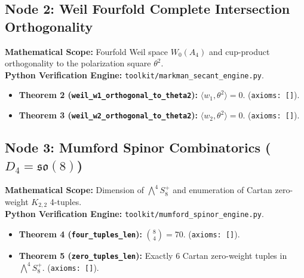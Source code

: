\documentclass[11pt,a4paper]{article}
\begin{document}
\subsection{Node 2: Weil Fourfold Complete Intersection Orthogonality}
\textbf{Mathematical Scope:} Fourfold Weil space $W_0(A_4)$ and cup-product orthogonality to the polarization square $\theta^2$.\\
\textbf{Python Verification Engine:} \texttt{toolkit/markman\_secant\_engine.py}.
\begin{itemize}[leftmargin=1.5em]
\item \textbf{Theorem 2 (\texttt{weil\_w1\_orthogonal\_to\_theta2}):} $\langle w_1, \theta^2 \rangle = 0$. (\texttt{axioms: []}).
\item \textbf{Theorem 3 (\texttt{weil\_w2\_orthogonal\_to\_theta2}):} $\langle w_2, \theta^2 \rangle = 0$. (\texttt{axioms: []}).
\end{itemize}

\subsection{Node 3: Mumford Spinor Combinatorics ($D_4 = \mathfrak{so}(8)$)}
\textbf{Mathematical Scope:} Dimension of $\bigwedge^4 S^+_8$ and enumeration of Cartan zero-weight $K_{2,2}$ 4-tuples.\\
\textbf{Python Verification Engine:} \texttt{toolkit/mumford\_spinor\_engine.py}.
\begin{itemize}[leftmargin=1.5em]
\item \textbf{Theorem 4 (\texttt{four\_tuples\_len}):} $\binom{8}{4} = 70$. (\texttt{axioms: []}).
\item \textbf{Theorem 5 (\texttt{zero\_tuples\_len}):} Exactly 6 Cartan zero-weight tuples in $\bigwedge^4 S^+_8$. (\texttt{axioms: []}).
\end{itemize}
\end{document}

